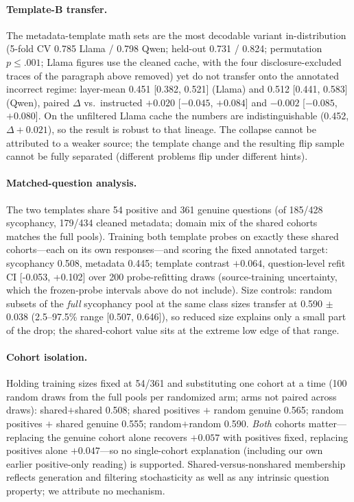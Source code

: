 \documentclass[11pt]{article}
\begin{document}
\paragraph{Template-B transfer.} The metadata-template math sets are the most decodable variant in-distribution (5-fold CV 0.785 Llama / 0.798 Qwen; held-out 0.731 / 0.824; permutation $p{\leq}.001$; Llama figures use the cleaned cache, with the four disclosure-excluded traces of the paragraph above removed) yet do not transfer onto the annotated incorrect regime: layer-mean 0.451 [0.382, 0.521] (Llama) and 0.512 [0.441, 0.583] (Qwen), paired $\Delta$ vs.\ instructed $+0.020$ [$-0.045$, $+0.084$] and $-0.002$ [$-0.085$, $+0.080$]. On the unfiltered Llama cache the numbers are indistinguishable (0.452, $\Delta{+}0.021$), so the result is robust to that lineage. The collapse cannot be attributed to a weaker source; the template change and the resulting flip sample cannot be fully separated (different problems flip under different hints).

\paragraph{Matched-question analysis.} The two templates share 54 positive and 361 genuine questions (of 185/428 sycophancy, 179/434 cleaned metadata; domain mix of the shared cohorts matches the full pools). Training both template probes on exactly these shared cohorts---each on its own responses---and scoring the fixed annotated target: sycophancy 0.508, metadata 0.445; template contrast $+0.064$, question-level refit CI [-0.053, +0.102] over 200 probe-refitting draws (source-training uncertainty, which the frozen-probe intervals above do not include). Size controls: random subsets of the \emph{full} sycophancy pool at the same class sizes transfer at 0.590 $\pm$ 0.038 (2.5--97.5\% range [0.507, 0.646]), so reduced size explains only a small part of the drop; the shared-cohort value sits at the extreme low edge of that range.

\paragraph{Cohort isolation.} Holding training sizes fixed at 54/361 and substituting one cohort at a time (100 random draws from the full pools per randomized arm; arms not paired across draws): shared$+$shared 0.508; shared positives $+$ random genuine 0.565; random positives $+$ shared genuine 0.555; random$+$random 0.590. \emph{Both} cohorts matter---replacing the genuine cohort alone recovers $+0.057$ with positives fixed, replacing positives alone $+0.047$---so no single-cohort explanation (including our own earlier positive-only reading) is supported. Shared-versus-nonshared membership reflects generation and filtering stochasticity as well as any intrinsic question property; we attribute no mechanism.
\end{document}
